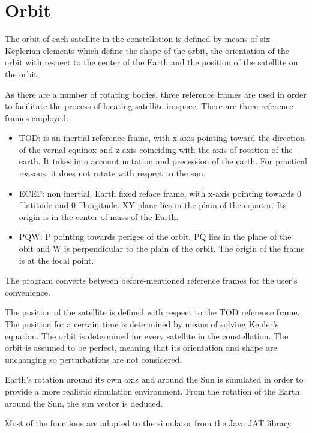 \section{Orbit}
\label{orbit}
The orbit of each satellite in the constellation is defined by means of six Keplerian elements which define the shape of the orbit, the orientation of the orbit with respect to the center of the Earth and the position of the satellite on the orbit. 

As there are a number of rotating bodies, three reference frames are used in order to facilitate the process of locating satellite in space. There are three reference frames employed:

\begin{itemize}
\item \acs{TOD}: is an inertial reference frame, with x-axis pointing toward the direction of the vernal equinox and z-axis coinciding with the axis of rotation of the earth. It takes into account nutation and precession of the earth. For practical reasons, it does not rotate with respect to the sun.
 
\item \acs{ECEF}: non inertial, Earth fixed reface frame, with x-axis pointing towards 0 ^\circ latitude and 0 ^\circ longitude. XY plane lies in the plain of the equator. Its origin is in the center of mass of the Earth. 

\item \acs{PQW}: P pointing towards perigee of the orbit, PQ lies in the plane of the obit and W is perpendicular to the plain of the orbit. The origin of the frame is at the focal point. 
\end{itemize}

The program converts between before-mentioned reference frames for the user's convenience.

The position of the satellite is defined with respect to the \acs{TOD} reference frame.  The position for a certain time is determined by means of solving Kepler's equation. The orbit is determined for every satellite in the constellation. The orbit is assumed to be perfect, meaning that its orientation and shape are unchanging so perturbations are not considered. 

Earth's rotation around its own axis and around the Sun is simulated in order to provide a more realistic simulation environment. From the rotation of the Earth around the Sun, the sun vector is deduced. 

Most of the functions are adapted to the simulator from the Java \acs{JAT} library. 

